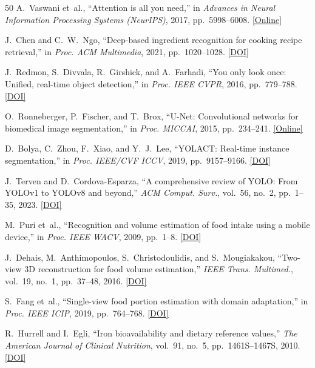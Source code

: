 \documentclass[conference]{IEEEtran}
\begin{document}
\begin{thebibliography}{50}
 A.~Vaswani et~al., ``Attention is all you need,'' in \emph{Advances in Neural Information Processing Systems (NeurIPS)}, 2017, pp.~5998--6008. \href{https://arxiv.org/abs/1706.03762}{[Online]}

 J.~Chen and C.~W.~Ngo, ``Deep-based ingredient recognition for cooking recipe retrieval,'' in \emph{Proc. ACM Multimedia}, 2021, pp.~1020--1028. \href{https://doi.org/10.1145/3474085.3475267}{[DOI]}

 J.~Redmon, S.~Divvala, R.~Girshick, and A.~Farhadi, ``You only look once: Unified, real-time object detection,'' in \emph{Proc. IEEE CVPR}, 2016, pp.~779--788. \href{https://doi.org/10.1109/CVPR.2016.91}{[DOI]}

 O.~Ronneberger, P.~Fischer, and T.~Brox, ``U-Net: Convolutional networks for biomedical image segmentation,'' in \emph{Proc. MICCAI}, 2015, pp.~234--241. \href{https://arxiv.org/abs/1505.04597}{[Online]}

 D.~Bolya, C.~Zhou, F.~Xiao, and Y.~J.~Lee, ``YOLACT: Real-time instance segmentation,'' in \emph{Proc. IEEE/CVF ICCV}, 2019, pp.~9157--9166. \href{https://doi.org/10.1109/ICCV.2019.00925}{[DOI]}

 J.~Terven and D.~Cordova-Esparza, ``A comprehensive review of YOLO: From YOLOv1 to YOLOv8 and beyond,'' \emph{ACM Comput. Surv.}, vol.~56, no.~2, pp.~1--35, 2023. \href{https://doi.org/10.1145/3605943}{[DOI]}

 M.~Puri et~al., ``Recognition and volume estimation of food intake using a mobile device,'' in \emph{Proc. IEEE WACV}, 2009, pp.~1--8. \href{https://doi.org/10.1109/WACV.2009.5403087}{[DOI]}

 J.~Dehais, M.~Anthimopoulos, S.~Christodoulidis, and S.~Mougiakakou, ``Two-view 3D reconstruction for food volume estimation,'' \emph{IEEE Trans. Multimed.}, vol.~19, no.~1, pp.~37--48, 2016. \href{https://doi.org/10.1109/TMM.2016.2612760}{[DOI]}

 S.~Fang et~al., ``Single-view food portion estimation with domain adaptation,'' in \emph{Proc. IEEE ICIP}, 2019, pp.~764--768. \href{https://doi.org/10.1109/ICIP.2019.8803623}{[DOI]}

 R.~Hurrell and I.~Egli, ``Iron bioavailability and dietary reference values,'' \emph{The American Journal of Clinical Nutrition}, vol.~91, no.~5, pp.~1461S--1467S, 2010. \href{https://doi.org/10.3945/ajcn.2010.28674F}{[DOI]}


\end{thebibliography}
\end{document}
